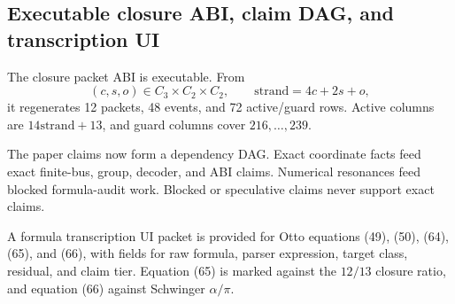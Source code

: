 \subsection{Executable closure ABI, claim DAG, and transcription UI}
\label{sec:bt1468-bt1470-abi-dag-transcription}

The closure packet ABI is executable.  From
\[
(c,s,o)\in C_3\times C_2\times C_2,
\qquad
\mathrm{strand}=4c+2s+o,
\]
it regenerates 12 packets, 48 events, and 72 active/guard rows.  Active columns
are \(14\mathrm{strand}+13\), and guard columns cover \(216,\ldots,239\).

The paper claims now form a dependency DAG.  Exact coordinate facts feed exact
finite-bus, group, decoder, and ABI claims.  Numerical resonances feed blocked
formula-audit work.  Blocked or speculative claims never support exact claims.

A formula transcription UI packet is provided for Otto equations (49), (50),
(64), (65), and (66), with fields for raw formula, parser expression, target
class, residual, and claim tier.  Equation (65) is marked against the \(12/13\)
closure ratio, and equation (66) against Schwinger \(\alpha/\pi\).
